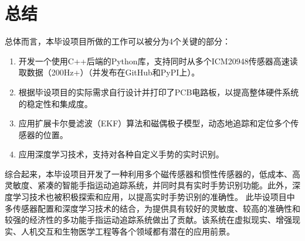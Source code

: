 \cleardoublepage
\section{总结}
总体而言，本毕设项目所做的工作可以被分为4个关键的部分：
\begin{enumerate}
    \item 开发一个使用C++后端的Python库，支持同时从多个ICM20948传感器高速读取数据（200Hz+）（并发布在GitHub和PyPI上）。
    \item 根据毕设项目的实际需求自行设计并打印了PCB电路板，以提高整体硬件系统的稳定性和集成度。
    \item 应用扩展卡尔曼滤波（EKF）算法和磁偶极子模型，动态地追踪和定位多个传感器的位置。
    \item 应用深度学习技术，支持对各种自定义手势的实时识别。
\end{enumerate}

综合起来，本毕设项目开发了一种利用多个磁传感器和惯性传感器的，低成本、高灵敏度、紧凑的智能手指运动追踪系统，并同时具有实时手势识别功能。此外，深度学习技术也被积极探索和应用，以提高实时手势识别的准确性。
此毕设项目中多传感器配置和深度学习技术的结合，为提供具有较好的灵敏度、较高的准确性和较强的经济性的多功能手指运动追踪系统做出了贡献。该系统在虚拟现实、增强现实、人机交互和生物医学工程等各个领域都有潜在的应用前景。